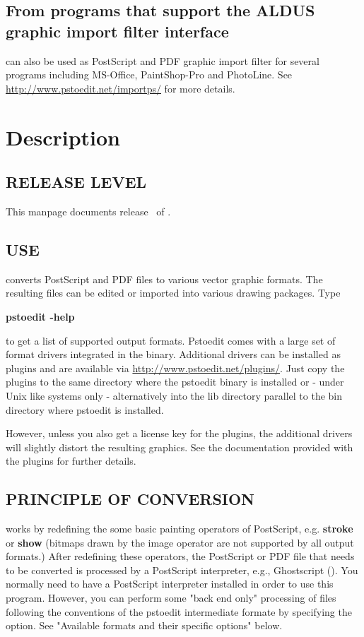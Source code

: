 \documentclass[english,a4paper]{article}
\let\URL\url \let\Email\url \let\File\url
\begin{document}
\subsection{From programs that support the ALDUS graphic import filter interface}
  
 can also be used as PostScript and PDF graphic import filter for several programs including
MS-Office,  PaintShop-Pro and PhotoLine. See 
\URL{http://www.pstoedit.net/importps/} for more 
details.

 
\section{Description}

\subsection{RELEASE LEVEL}

This manpage documents release \Version\ of . 

\subsection{USE}

 converts PostScript and PDF files to various vector graphic
formats. The resulting files can be edited or imported into various drawing
packages. Type 

     \textbf{pstoedit -help} 
     
\noindent to get a list of supported output formats. Pstoedit comes with a
large set of format drivers integrated in the binary. Additional drivers can be
installed as plugins and are available via 
\URL{http://www.pstoedit.net/plugins/}. 
Just copy the plugins to the same directory where the pstoedit binary is installed or - under Unix like systems only - alternatively into the lib directory parallel to the bin directory where pstoedit is installed.

However, unless you also get a license key for the plugins, the additional
drivers will slightly distort the resulting graphics. See the documentation
provided with the plugins for further details.

\subsection{PRINCIPLE OF CONVERSION}

 works by redefining the some basic painting operators of
PostScript, e.g. \textbf{stroke} or \textbf{show} (bitmaps drawn by the image
operator are not supported by all output formats.) After
redefining these operators, the PostScript or PDF file that needs to be
converted is processed by a PostScript interpreter, e.g., Ghostscript
(). You normally need to have a PostScript interpreter installed in
order to use this program. However, you can perform some "back end only" processing
of files following the conventions of the pstoedit intermediate formate by specifying the  option. See "Available formats and their specific options" below. 
\end{document}
